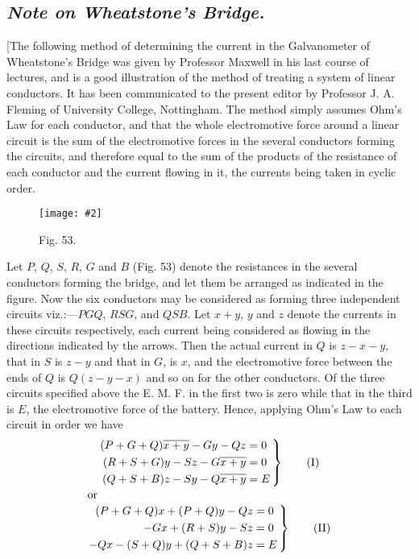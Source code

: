 \documentclass[12pt,oneside]{book}[2021/10/04]
\newcommand{\Heading}{\centering\normalfont}
\newcommand{\Subsection}[1]{\subsection*{\normalsize\Heading\itshape #1}}
\newcommand{\Runhead}[1]{\fancyhead[C]{\iffloatpage{}{\small#1}}}
\newcommand{\widefig}[3]{
\begin{figure}[ht!]
\centering
\texttt{[image: \#2]}
\caption*{\small #3}
\end{figure}}
\newcommand{\¬}{\hphantom{0}}
\begin{document}
\label{art:239}
\Subsection{Note on Wheatstone's Bridge.}

[The following method of determining the current in the Galvanometer
of Wheatstone's Bridge was given by Professor Maxwell
in his last course of lectures, and is a good illustration of the method
of treating a system of linear conductors. It has been communicated
to the present editor by Professor J. A. Fleming of University
College, Nottingham. The method simply assumes Ohm's Law for
each conductor, and that the whole electromotive force around a
linear circuit is the sum of the electromotive forces in the several
conductors forming the circuits, and therefore equal to the sum of
the products of the resistance of each conductor and the current
flowing in it, the currents being taken in cyclic order.
\Runhead{WHEATSTONE'S BRIDGE.}

\widefig{0.6}{225.png}{Fig. 53.}
Let \(P\), \(Q\), \(S\), \(R\), \(G\) and \(B\) (Fig. 53) denote the resistances in the
several conductors forming the bridge, and let them be arranged as
indicated in the figure. Now the six conductors may be considered
as forming three independent circuits viz.:---\(PGQ\), \(RSG\), and \(QSB\).
Let \(x + y\), \(y\) and \(z\) denote the currents in these circuits respectively,
each current being considered as flowing in the directions indicated
by the arrows. Then the actual current in \(Q\) is \(z - x - y\), that in
\(S\) is \(z - y\) and that in \(G\), is \(x\), and the electromotive force between
the ends of \(Q\) is \(Q(z - y - x)\) and so on for the other conductors.
Of the three circuits specified above the E. M. F. in the first two is
zero while that in the third is \(E\), the electromotive force of the
battery. Hence, applying Ohm's Law to each circuit in order we
have
\begin{gather*}
\left.
\begin{aligned}
 ( P + G + Q )\overline{ x + y} - Gy - Qz &= 0\\
 ( R + S + G )y - Sz - G \overline{x + y} &= 0\\
 ( Q + S + B )z - Sy - Q \overline{x + y} &= E
\end{aligned}
\,\right\}\tag{I}\\
\shortintertext{or}
\left.
\begin{aligned}
( P + G + Q )x + ( P + Q )y - Qz &= 0 \\
-Gx + ( R + S )y - Sz &= 0\\
-Qx - ( S + Q )y + ( Q + S + B )z &= E
\end{aligned}
\,\right\}\tag{II}
\end{gather*}
\end{document}
